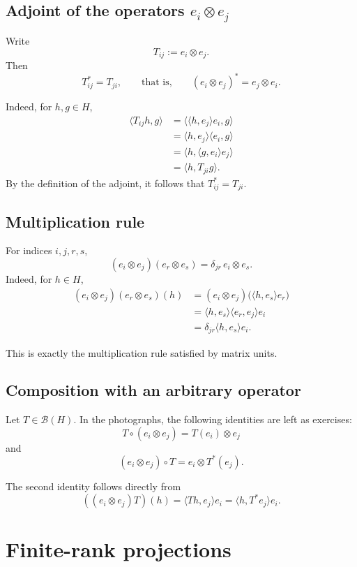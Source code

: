 \documentclass[11pt]{article}
\newcommand{\BH}{\mathcal{B}(H)}
\begin{document}
\subsection{Adjoint of the operators $e_i\otimes e_j$}

Write
\[
T_{ij}:=e_i\otimes e_j.
\]
Then
\[
T_{ij}^*=T_{ji},
\qquad\text{that is,}\qquad
(e_i\otimes e_j)^*=e_j\otimes e_i.
\]

Indeed, for $h,g\in H$,
\begin{align*}
\langle T_{ij}h,g\rangle
 &=\langle \langle h,e_j\rangle e_i,g\rangle\\
 &=\langle h,e_j\rangle\langle e_i,g\rangle\\
 &=\langle h,\langle g,e_i\rangle e_j\rangle\\
 &=\langle h,T_{ji}g\rangle.
\end{align*}
By the definition of the adjoint, it follows that $T_{ij}^*=T_{ji}$.

\subsection{Multiplication rule}

For indices $i,j,r,s$,
\[
(e_i\otimes e_j)(e_r\otimes e_s)
=
\delta_{jr}\,e_i\otimes e_s.
\]
Indeed, for $h\in H$,
\begin{align*}
(e_i\otimes e_j)(e_r\otimes e_s)(h)
 &= (e_i\otimes e_j)\bigl(\langle h,e_s\rangle e_r\bigr)\\
 &=\langle h,e_s\rangle\langle e_r,e_j\rangle e_i\\
 &=\delta_{jr}\langle h,e_s\rangle e_i.
\end{align*}

This is exactly the multiplication rule satisfied by matrix units.

\subsection{Composition with an arbitrary operator}

Let $T\in\BH$. In the photographs, the following identities are left as exercises:
\[
T\circ(e_i\otimes e_j)=T(e_i)\otimes e_j
\]
and
\[
(e_i\otimes e_j)\circ T=e_i\otimes T^*(e_j).
\]

The second identity follows directly from
\[
((e_i\otimes e_j)T)(h)
 =\langle Th,e_j\rangle e_i
 =\langle h,T^*e_j\rangle e_i.
\]

\section{Finite-rank projections}
\end{document}
